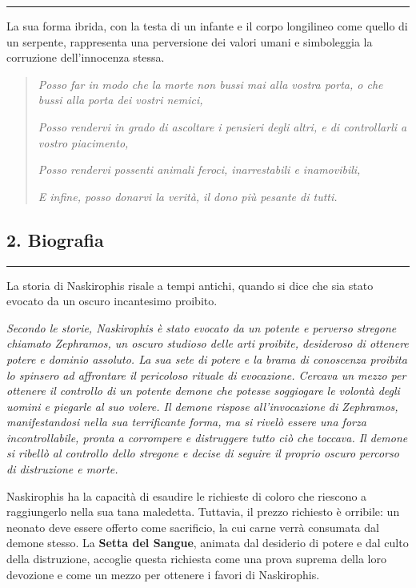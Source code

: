 \begin{center}\rule{0.5\linewidth}{0.5pt}\end{center}

La sua forma ibrida, con la testa di un infante e il corpo longilineo
come quello di un serpente, rappresenta una perversione dei valori umani
e simboleggia la corruzione dell'innocenza stessa.

\begin{quote}
\emph{Posso far in modo che la morte non bussi mai alla vostra porta, o
che bussi alla porta dei vostri nemici,}

\emph{Posso rendervi in grado di ascoltare i pensieri degli altri, e di
controllarli a vostro piacimento,}

\emph{Posso rendervi possenti animali feroci, inarrestabili e
inamovibili,}

\emph{E infine, posso donarvi la verità, il dono più pesante di tutti.}
\end{quote}

\subsection{2. Biografia}\label{biografia}

\begin{center}\rule{0.5\linewidth}{0.5pt}\end{center}

La storia di Naskirophis risale a tempi antichi, quando si dice che sia
stato evocato da un oscuro incantesimo proibito.

\emph{Secondo le storie, Naskirophis è stato evocato da un potente e
perverso stregone chiamato Zephramos, un oscuro studioso delle arti
proibite, desideroso di ottenere potere e dominio assoluto. La sua sete
di potere e la brama di conoscenza proibita lo spinsero ad affrontare il
pericoloso rituale di evocazione. Cercava un mezzo per ottenere il
controllo di un potente demone che potesse soggiogare le volontà degli
uomini e piegarle al suo volere. Il demone rispose all'invocazione di
Zephramos, manifestandosi nella sua terrificante forma, ma si rivelò
essere una forza incontrollabile, pronta a corrompere e distruggere
tutto ciò che toccava. Il demone si ribellò al controllo dello stregone
e decise di seguire il proprio oscuro percorso di distruzione e morte.}

Naskirophis ha la capacità di esaudire le richieste di coloro che
riescono a raggiungerlo nella sua tana maledetta. Tuttavia, il prezzo
richiesto è orribile: un neonato deve essere offerto come sacrificio, la
cui carne verrà consumata dal demone stesso. La \textbf{Setta del
Sangue}, animata dal desiderio di potere e dal culto della distruzione,
accoglie questa richiesta come una prova suprema della loro devozione e
come un mezzo per ottenere i favori di Naskirophis.

